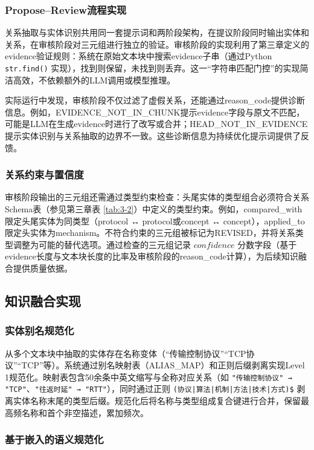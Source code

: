 \subsubsection{Propose--Review流程实现}

关系抽取与实体识别共用同一套提示词和两阶段架构，在提议阶段同时输出实体和关系，在审核阶段对三元组进行独立的验证。审核阶段的实现利用了第三章定义的evidence验证规则：系统在原始文本块中搜索evidence子串（通过Python \texttt{str.find()} 实现），找到则保留，未找到则丢弃。这一“字符串匹配门控”的实现简洁高效，不依赖额外的LLM调用或模型推理。

实际运行中发现，审核阶段不仅过滤了虚假关系，还能通过reason\_code提供诊断信息。例如，EVIDENCE\_NOT\_IN\_CHUNK提示evidence字段与原文不匹配，可能是LLM在生成evidence时进行了改写或合并；HEAD\_NOT\_IN\_EVIDENCE提示实体识别与关系抽取的边界不一致。这些诊断信息为持续优化提示词提供了反馈。

\subsubsection{关系约束与置信度}

审核阶段输出的三元组还需通过类型约束检查：头尾实体的类型组合必须符合关系Schema表（参见第三章表 \ref{tab:3-2}）中定义的类型约束。例如，compared\_with限定头尾实体为同类型（protocol ↔ protocol或concept ↔ concept），applied\_to限定头实体为mechanism。不符合约束的三元组被标记为REVISED，并将关系类型调整为可能的替代选项。通过检查的三元组记录 $confidence$ 分数字段（基于evidence长度与文本块长度的比率及审核阶段的reason\_code计算），为后续知识融合提供质量依据。

\subsection{知识融合实现}

\subsubsection{实体别名规范化}

从多个文本块中抽取的实体存在名称变体（“传输控制协议”“TCP协议”“TCP”等）。系统通过别名映射表（ALIAS\_MAP）和正则后缀剥离实现Level 1规范化。映射表包含50余条中英文缩写与全称对应关系（如 \texttt{"传输控制协议" → "TCP"}、\texttt{"往返时延" → "RTT"}），同时通过正则 \texttt{(协议|算法|机制|方法|技术|方式)\$} 剥离实体名称末尾的类型后缀。规范化后将名称与类型组成复合键进行合并，保留最高频名称和首个非空描述，累加频次。

\subsubsection{基于嵌入的语义规范化}

